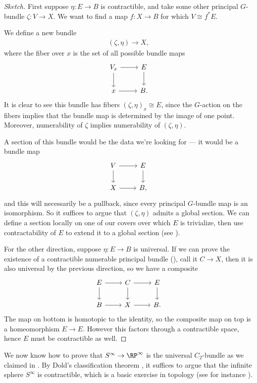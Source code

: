 \documentclass[11pt]{book}
\begin{document}
\begin{proof}[Sketch]
First suppose $\eta \colon E \to B$ is contractible, and take some other principal $G$-bundle $\zeta \colon V \to X$. We want to find a map $f \colon X \to B$ for which $V\cong f^\ast E$.

We define a new bundle
\begin{align*}
    ( \zeta,\eta ) \to X,
\end{align*}
where the fiber over $x$ is the set of all possible bundle maps
\[ \begin{tikzcd}
    V_x\rar\dar & E\dar\\
    x\rar & B.
\end{tikzcd} \]
It is clear to see this bundle has fibers $(\zeta,\eta)_x \cong E$, since the $G$-action on the fibers implies that the bundle map is determined by the image of one point. Moreover, numerability of $\zeta$ implies numerability of $(\zeta,\eta)$.

A section of this bundle would be the data we're looking for --- it would be a bundle map
\[ \begin{tikzcd}
    V\rar\dar & E\dar\\
    X\rar & B,
\end{tikzcd} \]
and this will necessarily be a pullback, since every principal $G$-bundle map is an isomorphism. So it suffices to argue that $(\zeta,\eta)$ admits a global section. We can define a section locally on one of our covers over which $E$ is trivialize, then use contractability of $E$ to extend it to a global section (see \cite[2.6,2.7,2.8]{doldPartitionsUnityTheory1963}).

For the other direction, suppose $\eta \colon E \to B$ is universal. If we can prove the existence of a contractible numerable principal bundle (\cite[\S8]{doldPartitionsUnityTheory1963}), call it $C \to X$, then it is also universal by the previous direction, so we have a composite
\[ \begin{tikzcd}
    E\rar\dar & C\rar\dar & E\dar \\
    B\rar & X\rar & B.
\end{tikzcd} \]
The map on bottom is homotopic to the identity, so the composite map on top is a homeomorphism $E \to E$. However this factors through a contractible space, hence $E$ must be contractible as well.
\end{proof}

\begin{remark}
We now know how to prove that $S^\infty \to \RP^\infty$ is the universal $C_2$-bundle as we claimed in . By Dold's classification theorem , it suffices to argue that the infinite sphere $S^\infty$ is contractible, which is a basic exercise in topology (see for instance \cite[p.~19]{Hatcher}).
\end{remark}
\end{document}

